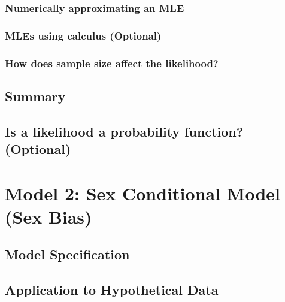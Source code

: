 \documentclass[
]{krantz}
\begin{document}
\hypertarget{numerically-approximating-an-mle}{%
\subsubsection{Numerically approximating an MLE}\label{numerically-approximating-an-mle}}

\hypertarget{calc-sec}{%
\subsubsection{MLEs using calculus (Optional)}\label{calc-sec}}

\hypertarget{how-does-sample-size-affect-the-likelihood}{%
\subsubsection{How does sample size affect the likelihood?}\label{how-does-sample-size-affect-the-likelihood}}

\hypertarget{summary}{%
\subsection{Summary}\label{summary}}

\hypertarget{is-a-likelihood-a-probability-function-optional}{%
\subsection{Is a likelihood a probability function? (Optional)}\label{is-a-likelihood-a-probability-function-optional}}

\hypertarget{sex_conditional.sec}{%
\section{Model 2: Sex Conditional Model (Sex Bias)}\label{sex_conditional.sec}}

\hypertarget{model-specification}{%
\subsection{Model Specification}\label{model-specification}}

\hypertarget{application-to-hypothetical-data}{%
\subsection{Application to Hypothetical Data}\label{application-to-hypothetical-data}}
\end{document}
